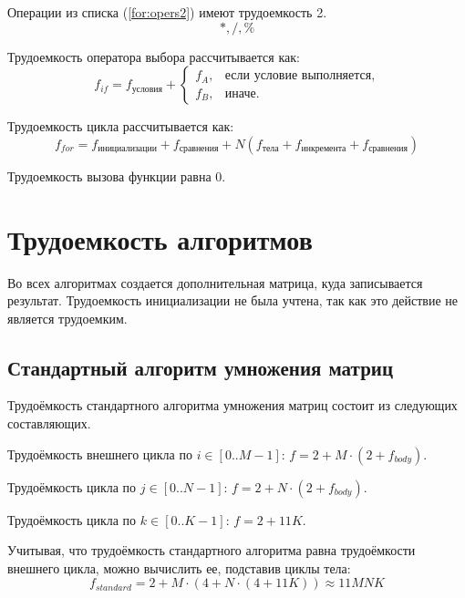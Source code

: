 Операции из списка (\ref{for:opers2}) имеют трудоемкость 2.
\begin{equation}
	\label{for:opers2}
	*, /, \%
\end{equation}

Трудоемкость оператора выбора  рассчитывается как:
\begin{equation}
	\label{for:if}
	f_{if} = f_{\text{условия}} +
	\begin{cases}
		f_A, & \text{если условие выполняется,}\\
		f_B, & \text{иначе.}
	\end{cases}
\end{equation}

Трудоемкость цикла рассчитывается как:
\begin{equation}
	\label{for:for}
	f_{for} = f_{\text{инициализации}} + f_{\text{сравнения}} + N(f_{\text{тела}} + f_{\text{инкремента}} + f_{\text{сравнения}})
\end{equation}

Трудоемкость вызова функции равна 0.


\section{Трудоемкость алгоритмов}

Во всех алгоритмах создается дополнительная матрица, куда записывается результат. Трудоемкость инициализации не была учтена, так как это действие не является трудоемким.

\subsection{Стандартный алгоритм умножения матриц}

Трудоёмкость стандартного алгоритма умножения матриц состоит из следующих составляющих.

Трудоёмкость внешнего цикла по $i \in [0..M-1]$: $f = 2 + M \cdot (2 + f_{body})$.

Трудоёмкость цикла по $j \in [0..N-1]$: $f = 2 + N \cdot (2 + f_{body})$.

Трудоёмкость цикла по $k \in [0..K-1]$: $f = 2 + 11K$.

Учитывая, что трудоёмкость стандартного алгоритма равна трудоёмкости внешнего цикла, можно вычислить ее, подставив циклы тела:
\begin{equation}
	\label{for:standard}
	f_{standard} = 2 + M \cdot (4 + N \cdot (4 + 11K)) \approx 11MNK
\end{equation}

